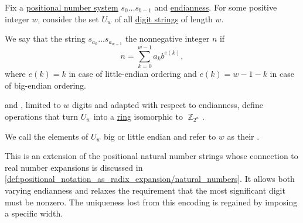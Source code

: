 \begin{definition}\label{def:ring_of_unsigned_integers}\mimprovised
  Fix a \hyperref[def:positional_number_system]{positional number system} \( s_0 \ldots s_{b-1} \) and \hyperref[def:endianness]{endianness}. For some positive integer \( w \), consider the set \( U_w \) of all \hyperref[def:positional_number_system]{digit strings} of length \( w \).

  We say that the string \( s_{a_0} \ldots s_{a_{w-1}} \)  the nonnegative integer \( n \) if
  \begin{equation*}
    n = \sum_{k=0}^{w-1} a_k b^{e(k)},
  \end{equation*}
  where \( e(k) = k \) in case of little-endian ordering and \( e(k) = w - 1 - k \) in case of big-endian ordering.

   and , limited to \( w \) digits and adapted with respect to endianness, define operations that turn \( U_w \) into a \hyperref[def:ring]{ring} isomorphic to \hyperref[def:ring_of_integers_modulo]{\( \BbbZ_{2^w} \)}.

  We call the elements of \( U_w \) big or little endian  and refer to \( w \) as their .
\end{definition}
\begin{comments}
  \item This is an extension of the positional natural number strings whose connection to real number expansions is discussed in \cref{def:positional_notation_as_radix_expansion/natural_numbers}. It allows both varying endianness and relaxes the requirement that the most significant digit must be nonzero. The uniqueness lost from this encoding is regained by imposing a specific width.
\end{comments}
